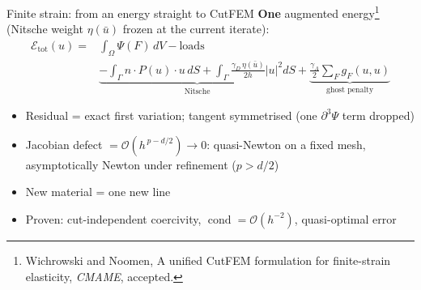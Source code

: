 \documentclass{beamer}
\begin{document}
\begin{frame}{Finite strain: from an energy straight to CutFEM}
    \small
    \textbf{One} augmented energy\footnote{Wichrowski and Noomen, A unified CutFEM formulation for finite-strain elasticity, \emph{CMAME}, accepted.} (Nitsche weight $\eta(\bar u)$ frozen at the current iterate):
    \begin{align*}
        \mathcal E_{\text{tot}}(u) = {} & \int_\Omega \Psi(F)\,dV - \text{loads}            \\
                                        & \underbrace{-\int_{\Gamma} n\cdot P(u)\cdot u\,dS
            + \int_{\Gamma}\tfrac{\gamma_D\,\eta(\bar u)}{2h}|u|^2 dS}_{\text{Nitsche}}
        + \underbrace{\tfrac{\gamma_A}{2}\sum_{F}g_F(u,u)}_{\text{ghost penalty}}
    \end{align*}
    \vspace{-0.8em}
    \begin{center}
    \end{center}
    \vspace{-0.9em}
    \begin{itemize}
        \footnotesize
        \setlength{\itemsep}{0.15em}
        \item Residual = exact first variation; tangent symmetrised (one $\partial^3\Psi$ term dropped)
        \item Jacobian defect $=\mathcal O(h^{\,p-d/2})\to 0$: quasi-Newton on a fixed mesh, \alert{asymptotically Newton} under
              refinement ($p>d/2$)
        \item \alert{New material = one new line}
        \item Proven: cut-independent coercivity, $\operatorname{cond} = \mathcal O(h^{-2})$, quasi-optimal error
    \end{itemize}
\end{frame}
\end{document}
